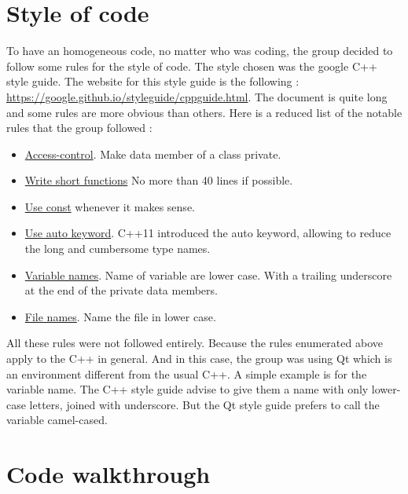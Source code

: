 \section{Style of code}
To have an homogeneous code, no matter who was coding, the group decided to follow some rules for the style of code. The style chosen was the google C++ style guide. The website for this style guide is the following : \url{https://google.github.io/styleguide/cppguide.html}.
The document is quite long and some rules are more obvious than others. Here is a reduced list of the notable rules that the group followed :
\begin{itemize}
	\item \href{https://google.github.io/styleguide/cppguide.html#Access_Control}{Access-control}. Make data member of a class private. 
	\item \href{https://google.github.io/styleguide/cppguide.html#Write_Short_Functions}{Write short functions} No more than 40 lines if possible.
	\item \href{https://google.github.io/styleguide/cppguide.html#Use_of_const}{Use const} whenever it makes sense.
	\item \href{https://google.github.io/styleguide/cppguide.html#auto}{Use auto keyword}. C++11 introduced the auto keyword, allowing to reduce the long and cumbersome type names.
	\item \href{https://google.github.io/styleguide/cppguide.html#Variable_Names}{Variable names}. Name of variable are lower case. With a trailing underscore at the end of the private data members.
	\item \href{https://google.github.io/styleguide/cppguide.html#File_Names}{File names}. Name the file in lower case.
\end{itemize}
All these rules were not followed entirely. Because the rules enumerated above apply to the C++ in general. And in this case, the group was using Qt which is an environment different from the usual C++. A simple example is for the variable name. The C++ style guide advise to give them a name with only lower-case letters, joined with underscore. But the Qt style guide prefers to call the variable camel-cased.

\section{Code walkthrough}


